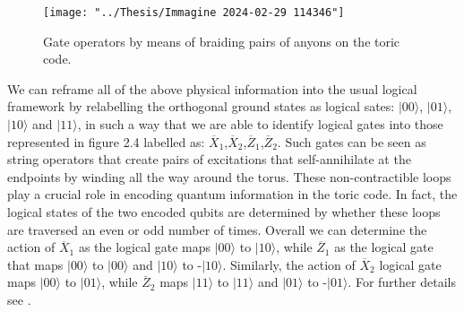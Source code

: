 \documentclass{Configuration_Files/PoliMi3i_thesis}
\begin{document}
\begin{figure}
	\centering
	\texttt{[image: "../Thesis/Immagine 2024-02-29 114346"]}
	\caption{Gate operators by means of braiding pairs of anyons on the toric code.}
	\label{fig:immagine-2024-02-29-114346}
\end{figure}


We can reframe all of the above physical information into the usual logical framework by relabelling the orthogonal ground states as logical sates: $|00\rangle$, $|01\rangle$, $|10\rangle$ and $|11\rangle$, in such a way that we are able to identify logical gates into those represented in figure 2.4 labelled as: $\overline{X}_1$,$\overline{X}_2$,$\overline{Z}_1$,$\overline{Z}_2$. \newline 
Such gates can be seen as string operators that create pairs of excitations that self-annihilate at the endpoints by winding all the way around the torus. 
These non-contractible loops play a crucial role in encoding quantum information in the toric code. In fact, the logical states of the two encoded qubits are determined by whether these loops are traversed an even or odd number of times. \newline
Overall we can determine the action of $\overline{X}_1$ as the logical gate maps $|00\rangle$ to $|10\rangle$, while $\overline{Z}_1$ as the logical gate that maps $|00\rangle$ to $|00\rangle$ and $|10\rangle$ to -$|10\rangle$. \newline
Similarly, the action of $\overline{X}_2$ logical gate maps $|00\rangle$ to $|01\rangle$, while $\overline{Z}_2$ maps $|11\rangle$ to $|11\rangle$ and $|01\rangle$ to -$|01\rangle$. For further details see \cite{Her20}.\newline
\end{document}
